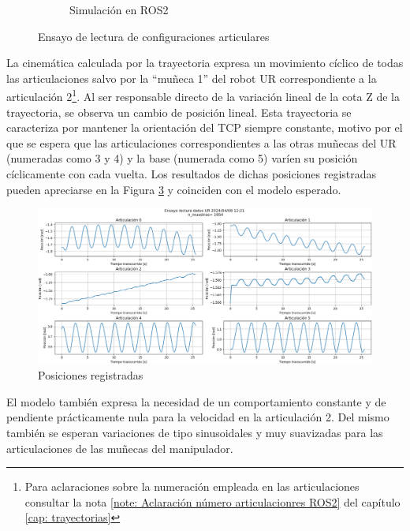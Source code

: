 \begin{figure}[h!]
\begin{subfigure}[h]{0.45\linewidth}
        \caption{Simulación en ROS2}
        \label{fig: trayectoria sacacorchos entorno virtual}
    \end{subfigure}
    \caption{Ensayo de lectura de configuraciones articulares}
\end{figure}

La cinemática calculada por la trayectoria expresa un movimiento cíclico de todas las articulaciones salvo por la \enquote{muñeca 1} del robot UR correspondiente a la articulación 2\footnote{Para aclaraciones sobre la numeración empleada en las articulaciones consultar la nota \ref{note: Aclaración número articulacionres ROS2}  del capítulo \ref{cap: trayectorias}}. Al ser responsable directo de la variación lineal de la cota Z de la trayectoria, se observa un cambio de posición lineal. Esta trayectoria se caracteriza por mantener la orientación del \acrshort{TCP} siempre constante, motivo por el que se espera que las articulaciones correspondientes a las  otras muñecas del UR (numeradas como 3 y 4) y la base (numerada como 5) varíen su posición cíclicamente con cada vuelta. Los resultados de dichas posiciones registradas pueden apreciarse en la Figura \ref{fig:trayectoria sacacorchos posiciones} y coinciden con el modelo esperado.

\begin{figure}[h!]
    \centering
    \includegraphics[scale=0.4]{figuras/ensayo_lectura_datos/posicion_sacacorchos.png}
    \caption{Posiciones registradas}
    \label{fig:trayectoria sacacorchos posiciones}
\end{figure}

El modelo también expresa la necesidad de un comportamiento constante y de pendiente prácticamente nula para la velocidad en la articulación 2. Del mismo también se esperan variaciones de tipo sinusoidales y muy suavizadas para las articulaciones de las muñecas del manipulador. 

